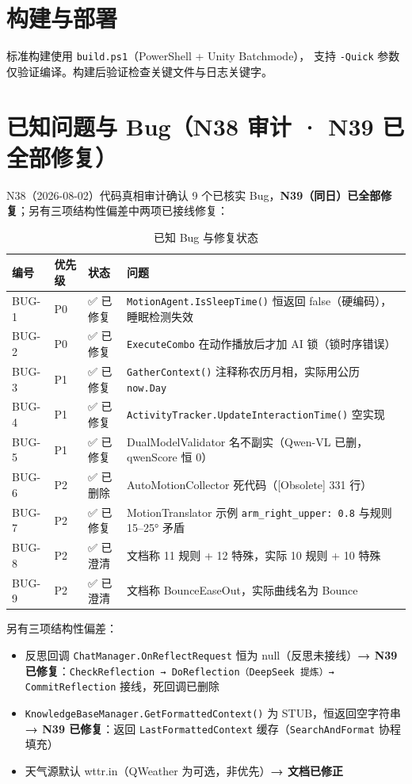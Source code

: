 \documentclass[12pt,a4paper]{ctexart}
\begin{document}
\section{构建与部署}

标准构建使用 \texttt{build.ps1}（PowerShell + Unity Batchmode），
支持 \texttt{-Quick} 参数仅验证编译。构建后验证检查关键文件与日志关键字。

\section{已知问题与 Bug（N38 审计 · N39 已全部修复）}

N38（2026-08-02）代码真相审计确认 9 个已核实 Bug，\textbf{N39（同日）已全部修复}；另有三项结构性偏差中两项已接线修复：

\begin{table}[H]
\centering
\caption{已知 Bug 与修复状态}
\label{tab:bugs}
\begin{tabular}{lllp{7cm}}
\toprule
\textbf{编号} & \textbf{优先级} & \textbf{状态} & \textbf{问题} \\
\midrule
BUG-1 & P0 & ✅ 已修复 & \texttt{MotionAgent.IsSleepTime()} 恒返回 false（硬编码），睡眠检测失效 \\
BUG-2 & P0 & ✅ 已修复 & \texttt{ExecuteCombo} 在动作播放后才加 AI 锁（锁时序错误） \\
BUG-3 & P1 & ✅ 已修复 & \texttt{GatherContext()} 注释称农历月相，实际用公历 \texttt{now.Day} \\
BUG-4 & P1 & ✅ 已修复 & \texttt{ActivityTracker.UpdateInteractionTime()} 空实现 \\
BUG-5 & P1 & ✅ 已修复 & DualModelValidator 名不副实（Qwen-VL 已删，qwenScore 恒 0） \\
BUG-6 & P2 & ✅ 已删除 & AutoMotionCollector 死代码（[Obsolete] 331 行） \\
BUG-7 & P2 & ✅ 已修复 & MotionTranslator 示例 \texttt{arm\_right\_upper: 0.8} 与规则 15--25° 矛盾 \\
BUG-8 & P2 & ✅ 已澄清 & 文档称 11 规则 + 12 特殊，实际 10 规则 + 10 特殊 \\
BUG-9 & P2 & ✅ 已澄清 & 文档称 BounceEaseOut，实际曲线名为 Bounce \\
\bottomrule
\end{tabular}
\end{table}

另有三项结构性偏差：

\begin{itemize}
    \item 反思回调 \texttt{ChatManager.OnReflectRequest} 恒为 null（反思未接线）\textbf{→ N39 已修复}：\texttt{CheckReflection → DoReflection（DeepSeek 提炼）→ CommitReflection} 接线，死回调已删除
    \item \texttt{KnowledgeBaseManager.GetFormattedContext()} 为 STUB，恒返回空字符串\textbf{→ N39 已修复}：返回 \texttt{LastFormattedContext} 缓存（\texttt{SearchAndFormat} 协程填充）
    \item 天气源默认 wttr.in（QWeather 为可选，非优先）\textbf{→ 文档已修正}
\end{itemize}
\end{document}
